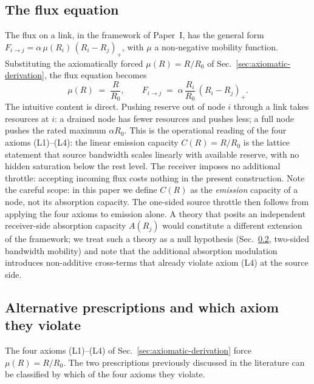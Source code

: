 \documentclass[11pt,a4paper]{article}
\begin{document}
\subsection{The flux equation}

The flux on a link, in the framework of Paper~I, has the
general form $F_{i \to j} = \alpha\,\mu(R_i)\,(R_i - R_j)_+$,
with $\mu$ a non-negative mobility function. Substituting the
axiomatically forced $\mu(R) = R/R_0$ of
Sec.~\ref{sec:axiomatic-derivation}, the flux equation becomes
\begin{equation}
\mu(R) \;=\; \frac{R}{R_0},
\qquad
F_{i \to j} \;=\; \alpha\, \frac{R_i}{R_0}\, (R_i - R_j)_+.
\label{eq:throttle}
\end{equation}
The intuitive content is direct. Pushing reserve out of node $i$
through a link takes resources at $i$: a drained node has fewer
resources and pushes less; a full node pushes the rated maximum
$\alpha R_0$. This is the operational reading of the four
axioms (L1)--(L4): the linear emission capacity $C(R) = R/R_0$ is
the lattice statement that source bandwidth scales linearly with
available reserve, with no hidden saturation below the rest
level. The receiver imposes no additional throttle: accepting
incoming flux costs nothing in the present construction. Note
the careful scope: in this paper we define $C(R)$ as the
\emph{emission} capacity of a node, not its absorption capacity.
The one-sided source throttle then follows from applying the
four axioms to emission alone. A theory that posits an
independent receiver-side absorption capacity $A(R_j)$ would
constitute a different extension of the framework; we treat such
a theory as a null hypothesis (Sec.~\ref{sec:throttle-prescription},
two-sided bandwidth mobility) and note that the additional
absorption modulation introduces non-additive cross-terms that
already violate axiom (L4) at the source side.

\subsection{Alternative prescriptions and which axiom they violate}
\label{sec:throttle-prescription}

The four axioms (L1)--(L4) of
Sec.~\ref{sec:axiomatic-derivation} force
$\mu(R) = R/R_0$. The two prescriptions previously discussed in
the literature can be classified by which of the four axioms
they violate.
\end{document}
